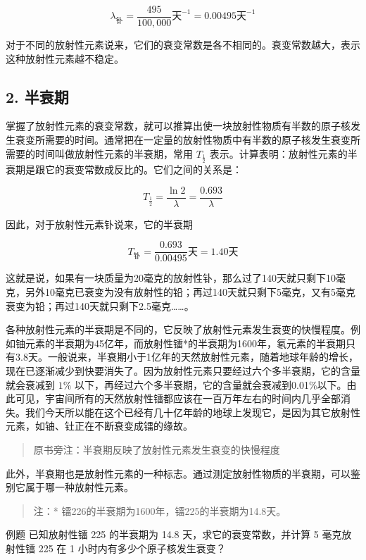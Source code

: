 \[
\lambda_ {\mathrm{钋}} = \frac {495}{100 , 000} \text{天} ^ {- 1} = 0.00495 \text{天} ^ {- 1}
\]

对于不同的放射性元素说来，它们的衰变常数是各不相同的。衰变常数越大，表示这种放射性元素越不稳定。

\subsection{2. 半衰期}

掌握了放射性元素的衰变常数，就可以推算出使一块放射性物质有半数的原子核发生衰变所需要的时间。通常把在一定量的放射性物质中有半数的原子核发生衰变所需要的时间叫做放射性元素的半衰期，常用
\(T_{\frac{1}{2}}\)
表示。计算表明：放射性元素的半衰期是跟它的衰变常数成反比的。它们之间的关系是：

\[
T _ {\frac {1}{2}} = \frac {\ln 2}{\lambda} = \frac {0.693}{\lambda} \tag {10.3}
\]

因此，对于放射性元素钋说来，它的半衰期

\[
T _ {\mathrm{钋}} = \frac {0.693}{0.00495} \text{天} = 1.40 \text{天}
\]

这就是说，如果有一块质量为20毫克的放射性钋，那么过了140天就只剩下10毫克，另外10毫克已衰变为没有放射性的铅；再过140天就只剩下5毫克，又有5毫克衰变为铅；再过140天就只剩下2.5毫克\ldots\ldots。

各种放射性元素的半衰期是不同的，它反映了放射性元素发生衰变的快慢程度。例如铀元素的半衰期为45亿年，而放射性镭*的半衰期为1600年，氡元素的半衰期只有3.8天。一般说来，半衰期小于1亿年的天然放射性元素，随着地球年龄的增长，现在已逐渐减少到快要消失了。因为放射性元素只要经过六个多半衰期，它的含量就会衰减到
\(1\%\)
以下，再经过六个多半衰期，它的含量就会衰减到0.01\%以下。由此可见，宇宙间所有的天然放射性镭都应该在一百万年左右的时间内几乎全部消失。我们今天所以能在这个已经有几十亿年龄的地球上发现它，是因为其它放射性元素，如铀、钍正在不断衰变成镭的缘故。

\begin{quote}
原书旁注：半衰期反映了放射性元素发生衰变的快慢程度
\end{quote}

此外，半衰期也是放射性元素的一种标志。通过测定放射性物质的半衰期，可以鉴别它属于哪一种放射性元素。

\begin{quote}
注：* 镭226的半衰期为1600年，镭225的半衰期为14.8天。
\end{quote}

例题 已知放射性镭 225 的半衰期为 14.8 天，求它的衰变常数，并计算 5
毫克放射性镭 225 在 1 小时内有多少个原子核发生衰变？

